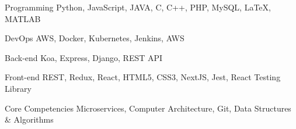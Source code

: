 

\begin{cvskills}

  \cvskill
    {Programming} %
    {Python, JavaScript, JAVA, C, C++, PHP, MySQL, LaTeX, MATLAB} %

  \cvskill
    {DevOps} %
    {AWS, Docker, Kubernetes, Jenkins, AWS } %

  \cvskill
    {Back-end} %
    {Koa, Express, Django, REST API} %

  \cvskill
    {Front-end} %
    {REST, Redux, React, HTML5, CSS3, NextJS, Jest, React Testing Library} %

  \cvskill
    {Core Competencies} %
    {Microservices, Computer Architecture, Git, Data Structures \& Algorithms} %

\end{cvskills}
